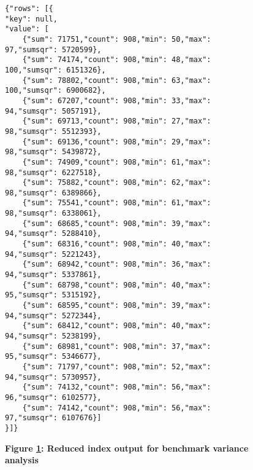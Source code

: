 \begin{figure}[H]
    \centering
    \begin{mdframed}
        \centering
        \begin{verbatim}
{"rows": [{
"key": null,    
"value": [
    {"sum": 71751,"count": 908,"min": 50,"max": 97,"sumsqr": 5720599},
    {"sum": 74174,"count": 908,"min": 48,"max": 100,"sumsqr": 6151326},
    {"sum": 78802,"count": 908,"min": 63,"max": 100,"sumsqr": 6900682},
    {"sum": 67207,"count": 908,"min": 33,"max": 94,"sumsqr": 5057191},
    {"sum": 69713,"count": 908,"min": 27,"max": 98,"sumsqr": 5512393},
    {"sum": 69136,"count": 908,"min": 29,"max": 98,"sumsqr": 5439872},
    {"sum": 74909,"count": 908,"min": 61,"max": 98,"sumsqr": 6227518},
    {"sum": 75882,"count": 908,"min": 62,"max": 98,"sumsqr": 6389866},
    {"sum": 75541,"count": 908,"min": 61,"max": 98,"sumsqr": 6338061},
    {"sum": 68685,"count": 908,"min": 39,"max": 94,"sumsqr": 5288410},
    {"sum": 68316,"count": 908,"min": 40,"max": 94,"sumsqr": 5221243},
    {"sum": 68942,"count": 908,"min": 36,"max": 94,"sumsqr": 5337861},
    {"sum": 68798,"count": 908,"min": 40,"max": 95,"sumsqr": 5315192},
    {"sum": 68595,"count": 908,"min": 39,"max": 94,"sumsqr": 5272344},
    {"sum": 68412,"count": 908,"min": 40,"max": 94,"sumsqr": 5238199},
    {"sum": 68981,"count": 908,"min": 37,"max": 95,"sumsqr": 5346677},
    {"sum": 71797,"count": 908,"min": 52,"max": 94,"sumsqr": 5730957},
    {"sum": 74132,"count": 908,"min": 56,"max": 96,"sumsqr": 6102577},
    {"sum": 74142,"count": 908,"min": 56,"max": 97,"sumsqr": 6107676}]
}]}      
        \end{verbatim}
    \end{mdframed}
    \caption[Benchmark variance: reduced index output]{\textbf{Figure \ref{fig-variance-reduce-output}: Reduced index output for benchmark variance analysis}}
    \label{fig-variance-reduce-output}
\end{figure}
